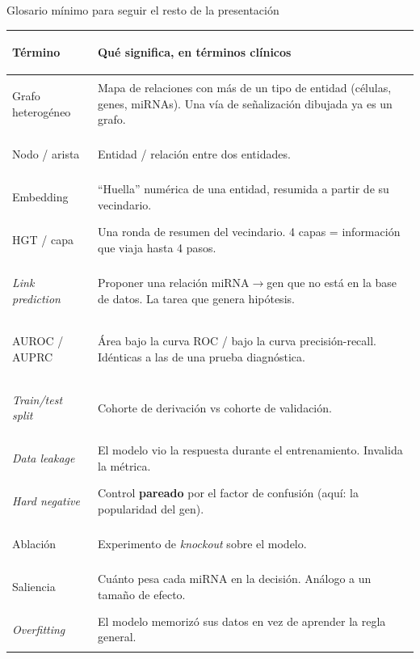 
\begin{frame}{Glosario m\'inimo para seguir el resto de la presentaci\'on}
  \scriptsize
  \begin{tabularx}{\textwidth}{>{\bfseries\raggedright\arraybackslash}p{3.0cm} >{\raggedright\arraybackslash}X}
    \toprule
    T\'ermino & Qu\'e significa, en t\'erminos cl\'inicos \\
    \midrule
    Grafo heterog\'eneo & Mapa de relaciones con m\'as de un tipo de entidad (c\'elulas, genes, miRNAs). Una v\'ia de se\~nalizaci\'on dibujada ya es un grafo. \\
    Nodo / arista & Entidad / relaci\'on entre dos entidades. \\
    Embedding & ``Huella'' num\'erica de una entidad, resumida a partir de su vecindario. \\
    HGT / capa & Una ronda de resumen del vecindario. 4 capas = informaci\'on que viaja hasta 4 pasos. \\
    \emph{Link prediction} & Proponer una relaci\'on miRNA$\to$gen que no est\'a en la base de datos. La tarea que genera hip\'otesis. \\
    AUROC / AUPRC & \'Area bajo la curva ROC / bajo la curva precisi\'on-recall. Id\'enticas a las de una prueba diagn\'ostica. \\
    \emph{Train/test split} & Cohorte de derivaci\'on vs cohorte de validaci\'on. \\
    \emph{Data leakage} & El modelo vio la respuesta durante el entrenamiento. Invalida la m\'etrica. \\
    \emph{Hard negative} & Control \textbf{pareado} por el factor de confusi\'on (aqu\'i: la popularidad del gen). \\
    Ablaci\'on & Experimento de \emph{knockout} sobre el modelo. \\
    Saliencia & Cu\'anto pesa cada miRNA en la decisi\'on. An\'alogo a un tama\~no de efecto. \\
    \emph{Overfitting} & El modelo memoriz\'o sus datos en vez de aprender la regla general. \\
    \bottomrule
  \end{tabularx}
\end{frame}
